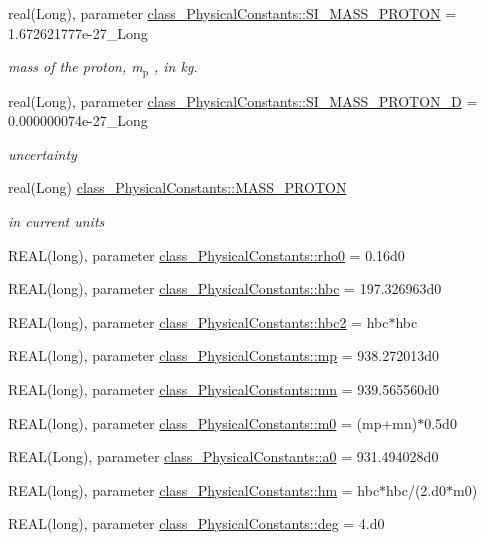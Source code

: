 \begin{DoxyCompactItemize}
real(Long), parameter \hyperlink{namespaceclass__PhysicalConstants_a2449bd62711b0a1ee76be095516a13da}{class\_\-PhysicalConstants::SI\_\-MASS\_\-PROTON} = 1.672621777e-\/27\_\-Long
\begin{DoxyCompactList}\small\item\em mass of the proton, m$_{\mbox{p}}$ , in kg. \item\end{DoxyCompactList}\item 
real(Long), parameter \hyperlink{namespaceclass__PhysicalConstants_a22a22c3caa590bb80989439fea138dca}{class\_\-PhysicalConstants::SI\_\-MASS\_\-PROTON\_\-D} = 0.000000074e-\/27\_\-Long
\begin{DoxyCompactList}\small\item\em uncertainty \item\end{DoxyCompactList}\item 
real(Long) \hyperlink{namespaceclass__PhysicalConstants_a91ea21ef8a0bb29bf99b041c512b6859}{class\_\-PhysicalConstants::MASS\_\-PROTON}
\begin{DoxyCompactList}\small\item\em in current units \item\end{DoxyCompactList}\item 
REAL(long), parameter \hyperlink{namespaceclass__PhysicalConstants_afd1e8c949a1607aa74c06b2cf93718a8}{class\_\-PhysicalConstants::rho0} = 0.16d0
\item 
REAL(long), parameter \hyperlink{namespaceclass__PhysicalConstants_a7d9801ae88aee6ffd97a9c8e988c66ec}{class\_\-PhysicalConstants::hbc} = 197.326963d0
\item 
REAL(long), parameter \hyperlink{namespaceclass__PhysicalConstants_a122a8419f83dc397e3a760e7b07d672f}{class\_\-PhysicalConstants::hbc2} = hbc$\ast$hbc
\item 
REAL(long), parameter \hyperlink{namespaceclass__PhysicalConstants_af900f95fb8cae7b7b7b9b8489734d0e1}{class\_\-PhysicalConstants::mp} = 938.272013d0
\item 
REAL(long), parameter \hyperlink{namespaceclass__PhysicalConstants_a666719c036c1ac2a2ad0f78137eb7b99}{class\_\-PhysicalConstants::mn} = 939.565560d0
\item 
REAL(long), parameter \hyperlink{namespaceclass__PhysicalConstants_a6a2b98e5cc0028b726afab655255b5c8}{class\_\-PhysicalConstants::m0} = (mp+mn)$\ast$0.5d0
\item 
REAL(Long), parameter \hyperlink{namespaceclass__PhysicalConstants_a1e0e8fd471248a1082bc06f8ff7ecd65}{class\_\-PhysicalConstants::a0} = 931.494028d0
\item 
REAL(long), parameter \hyperlink{namespaceclass__PhysicalConstants_a5d8b8543af92098fe08729607d72a22a}{class\_\-PhysicalConstants::hm} = hbc$\ast$hbc/(2.d0$\ast$m0)
\item 
REAL(long), parameter \hyperlink{namespaceclass__PhysicalConstants_ace0fddb4ccc5b1acf56249fc4ab56379}{class\_\-PhysicalConstants::deg} = 4.d0
\end{DoxyCompactItemize}
